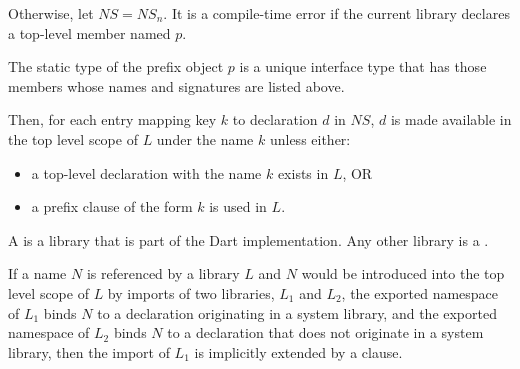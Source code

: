 \documentclass[makeidx]{article}
\begin{document}
{\LMHash{}%
Otherwise, let $NS = NS_n$.
It is a compile-time error if the current library declares a top-level member named $p$.

The static type of the prefix object $p$ is a unique interface type that has those members whose names and signatures are listed above.


\LMHash{}%
Then, for each entry mapping key $k$ to declaration $d$ in $NS$, $d$ is made available in the top level scope of $L$ under the name $k$ unless either:
\begin{itemize}
\item
a top-level declaration with the name $k$ exists in $L$, OR
\item a prefix clause of the form \AS{} $k$ is used in $L$.
\end{itemize}


\LMHash{}%
A  is a library that is part of the Dart implementation.
Any other library is a .

If a name $N$ is referenced by a library $L$
and $N$ would be introduced into the top level scope of $L$
by imports of two libraries, $L_1$ and $L_2$,
the exported namespace of $L_1$ binds $N$
to a declaration originating in a system library,
and the exported namespace of $L_2$ binds $N$ to a declaration
that does not originate in a system library,
then the import of $L_1$ is implicitly extended by a  clause.

}
\end{document}
